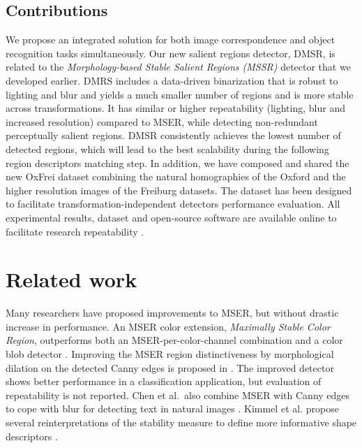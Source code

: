\documentclass[conference,compsoc]{IEEEtran}
\begin{document}
\subsection{Contributions}
 We propose an integrated solution for both image correspondence and object recognition tasks simultaneously. Our new salient regions detector, DMSR, is related to the {\em Morphology-based Stable Salient Regions (MSSR)} detector that we developed earlier\cite{RangMSSR06, RangHumpb06}. DMRS includes a data-driven binarization that is robust to lighting and blur and yields a much smaller number of regions and is more stable across transformations. It has similar or higher  repeatability (lighting, blur and increased resolution) compared to MSER, while detecting non-redundant perceptually salient regions. DMSR consistently achieves the lowest number of detected regions, which will lead to the best scalability during the following region descriptors matching step.  In addition, we have composed and shared the new OxFrei dataset combining the natural homographies of the Oxford and the higher resolution images of the Freiburg datasets. The dataset has been designed to facilitate transformation-independent detectors performance evaluation. All experimental results, dataset and open-source software are available online to facilitate research repeatability \cite{elena_ranguelova_2016_45156}. 


\section{Related work}
Many researchers have proposed improvements to MSER, but without drastic increase in performance. An MSER color extension, {\em Maximally Stable Color Region}, outperforms both an MSER-per-color-channel combination and a color blob detector \cite{Forssen07}. Improving the MSER region distinctiveness by morphological dilation on the detected Canny edges is proposed in \cite{Wang14}. The improved detector shows better performance in a classification application, but evaluation of repeatability is not reported. 
Chen et al.~also combine MSER with Canny edges to cope with blur for detecting text in natural images \cite{Chen11}.
Kimmel et al. %
propose several reinterpretations of the stability measure to define more informative shape descriptors \cite{Kimmel11}. 
\end{document}
